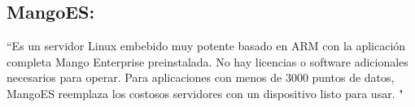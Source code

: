 \subsection{MangoES:} ``Es un servidor Linux embebido muy potente basado en ARM con la aplicación completa Mango Enterprise preinstalada. No hay licencias o software adicionales necesarios para operar. Para aplicaciones con menos de 3000 puntos de datos, MangoES reemplaza los costosos servidores con un dispositivo listo para usar. "\textcolor{blue}{\cite{MANGO}}
    

\newpage
